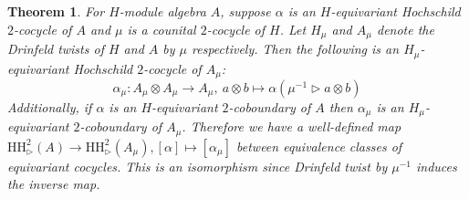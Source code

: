\documentclass[10pt]{article}
\newcommand{\rt}{\xrightarrow{}}
\newcommand{\HH}{\text{HH}}
\newtheorem{theorem}[lemma]{Theorem}
\theoremstyle{definition}
\begin{document}
\begin{theorem}\label{cocycle_map_proof} For $H$-module algebra $A$, suppose $\alpha$ is an $H$-equivariant Hochschild $2$-cocycle of $A$ and $\mu$ is a counital $2$-cocycle of $H$. Let $H_\mu$ and $A_\mu$ denote the Drinfeld twists of $H$ and $A$ by $\mu$ respectively. Then the following is an $H_\mu$-equivariant Hochschild $2$-cocycle of $A_\mu$:
$$\alpha_\mu:A_\mu\otimes A_\mu\rt A_\mu,\ a\otimes b\mapsto \alpha(\mu^{-1}\rhd a\otimes b)$$
Additionally, if $\alpha$ is an $H$-equivariant $2$-coboundary of $A$ then $\alpha_\mu$ is an $H_\mu$-equivariant $2$-coboundary of $A_\mu$. Therefore we have a well-defined map $\HH_\rhd^2(A)\rt \HH_\rhd^2(A_\mu),[\alpha]\mapsto [\alpha_\mu]$ between equivalence classes of equivariant cocycles. This is an isomorphism since Drinfeld twist by $\mu^{-1}$ induces the inverse map.


\end{theorem}
\end{document}
